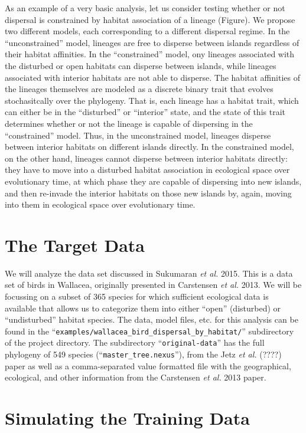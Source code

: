 \documentclass[11pt,openany]{memoir} %
\begin{document}
As an example of a very basic analysis, let us consider testing whether or not dispersal is constrained by habitat association of a lineage (Figure).
We propose two different models, each corresponding to a different dispersal regime.
In the ``unconstrained'' model, lineages are free to disperse between islands regardless of their habitat affinities.
In the ``constrained'' model, ony lineages associated with the disturbed or open habitats can disperse between islands, while lineages associated with interior habitats are not able to disperse.
The habitat affinities of the lineages themselves are modeled as a discrete binary trait that evolves stochasitcally over the phylogeny.
That is, each lineage has a habitat trait, which can either be in the ``disturbed'' or ``interior'' state, and the state of this trait determines whether or not the lineage is capable of dispersing in the ``constrained'' model.
Thus, in the unconstrained model, lineages disperse between interior habitats on different islands directly.
In the constrained model, on the other hand, lineages cannot disperse between interior habitats directly: they have to move into a disturbed habitat association in ecological space over evolutionary time, at which phase they are capable of dispersing into new islands, and then re-invade the interior habitats on those new islands by, again, moving into them in ecological space over evolutionary time.

\section{The Target Data}

We will analyze the data set discussed in Sukumaran \textit{et al.} 2015.
This is a data set of birds in Wallacea, originally presented in Carstensen \textit{et al.} 2013.
We will be focussing on a subset of 365 species for which sufficient ecological data is available that allows us to categorize them into either ``open'' (disturbed) or ``undisturbed'' habitat species.
The data, model files, etc. for this analysis can be found in the ``\texttt{examples/wallacea\_bird\_dispersal\_by\_habitat/}'' subdirectory of the project directory.
The subdirectory ``\texttt{original-data}'' has the full phylogeny of 549 species (``\texttt{master\_tree.nexus}''), from the Jetz \textit{et al.} (????) paper as well as a comma-separated value formatted file with the geographical, ecological, and other information from the Carstensen \textit{et al.} 2013 paper.

\section{Simulating the Training Data}
\end{document}
